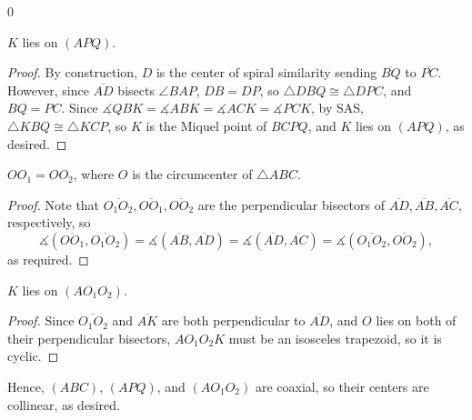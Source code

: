 \setcounter{iclaim}0
\begin{iclaim}
    $K$ lies on $(APQ)$.
\end{iclaim}
\begin{proof}
    By construction, $D$ is the center of spiral similarity sending $\overline{BQ}$ to $\overline{PC}$. However, since $\overline{AD}$ bisects $\angle BAP$, $DB=DP$, so $\triangle DBQ\cong\triangle DPC$, and $BQ=PC$. Since $\measuredangle QBK=\measuredangle ABK=\measuredangle ACK=\measuredangle PCK$, by SAS, $\triangle KBQ\cong\triangle KCP$, so $K$ is the Miquel point of $BCPQ$, and $K$ lies on $(APQ)$, as desired.
\end{proof}
\begin{iclaim}
    $OO_1=OO_2$, where $O$ is the circumcenter of $\triangle ABC$.
\end{iclaim}
\begin{proof}
    Note that $\overline{O_1O_2},\overline{OO_1},\overline{OO_2}$ are the perpendicular bisectors of $\overline{AD},\overline{AB},\overline{AC}$, respectively, so \[\measuredangle(\overline{OO_1},\overline{O_1O_2})=\measuredangle(\overline{AB},\overline{AD})=\measuredangle(\overline{AD},\overline{AC})=\measuredangle(\overline{O_1O_2},\overline{OO_2}),\]
    as required.
\end{proof}
\begin{iclaim}
    $K$ lies on $(AO_1O_2)$.
\end{iclaim}
\begin{proof}
    Since $\overline{O_1O_2}$ and $\overline{AK}$ are both perpendicular to $\overline{AD}$, and $O$ lies on both of their perpendicular bisectors, $AO_1O_2K$ must be an isosceles trapezoid, so it is cyclic.
\end{proof}

Hence, $(ABC)$, $(APQ)$, and $(AO_1O_2)$ are coaxial, so their centers are collinear, as desired.

